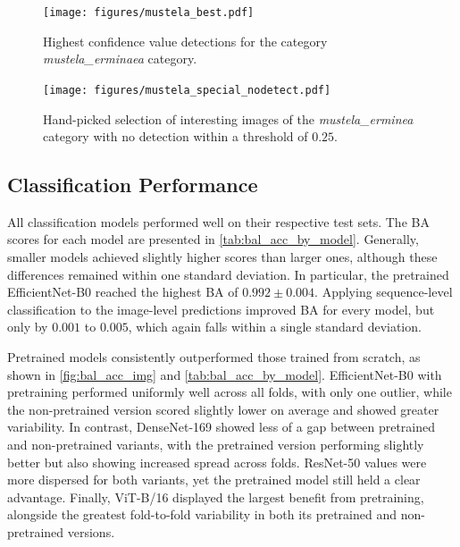 

\begin{figure}[]
\centering
\texttt{[image: figures/mustela\_best.pdf]}
\caption{Highest confidence value detections for the category \textit{mustela\_erminaea} category.}
\label{fig:detection_mustela_best}
\end{figure}

\begin{figure}[]
\centering
\texttt{[image: figures/mustela\_special\_nodetect.pdf]}
\caption{Hand-picked selection of interesting images of the \textit{mustela\_erminea} category with no detection within a threshold of \(0.25\).}
\label{fig:detection_special_nodetect}
\end{figure}

\subsection{Classification Performance}
All classification models performed well on their respective test sets.
The \ac{BA} scores for each model are presented in \autoref{tab:bal_acc_by_model}.
Generally, smaller models achieved slightly higher scores than larger ones, although these differences remained within one standard deviation.
In particular, the pretrained EfficientNet-B0 reached the highest \ac{BA} of \(0.992\pm0.004\).
Applying sequence-level classification to the image-level predictions improved \ac{BA} for every model, but only by \(0.001\) to \(0.005\), which again falls within a single standard deviation.

Pretrained models consistently outperformed those trained from scratch, as shown in \autoref{fig:bal_acc_img} and \autoref{tab:bal_acc_by_model}.
EfficientNet-B0 with pretraining performed uniformly well across all folds, with only one outlier, while the non-pretrained version scored slightly lower on average and showed greater variability.
In contrast, DenseNet-169 showed less of a gap between pretrained and non-pretrained variants, with the pretrained version performing slightly better but also showing increased spread across folds.
ResNet-50 values were more dispersed for both variants, yet the pretrained model still held a clear advantage.
Finally, ViT-B/16 displayed the largest benefit from pretraining, alongside the greatest fold-to-fold variability in both its pretrained and non-pretrained versions.


